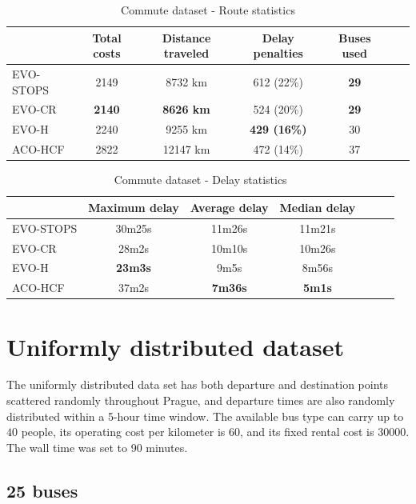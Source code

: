 \begin{table}
    \centering
    \begin{tabular}{lcccccc}
         & Total costs & Distance traveled & Delay penalties & Buses used \\
         \hline
         EVO-STOPS & 2149 & 8732 km & 612 (22\%) & \textbf{29} \\
         EVO-CR & \textbf{2140} & \textbf{8626 km} & 524 (20\%) & \textbf{29} \\
         EVO-H & 2240 & 9255 km & \textbf{429 (16\%)} & 30 \\
         ACO-HCF & 2822 & 12147 km & 472 (14\%) & 37 \\
    \end{tabular}
    \caption{Commute dataset - Route statistics}
    \label{tab:exp_commute_route_stats}
\end{table}

\begin{table}
    \centering
    \begin{tabular}{lcccccc}
         &  Maximum delay & Average delay & Median delay \\
         \hline
         EVO-STOPS & 30m25s & 11m26s & 11m21s \\
         EVO-CR & 28m2s & 10m10s & 10m26s \\
         EVO-H & \textbf{23m3s} & 9m5s & 8m56s \\
         ACO-HCF & 37m2s & \textbf{7m36s} & \textbf{5m1s} \\
    \end{tabular}
    \caption{Commute dataset - Delay statistics}
    \label{tab:exp_commute_delay_stats}
\end{table}

\clearpage

\section{Uniformly distributed dataset}

The uniformly distributed data set has both departure and destination points scattered randomly throughout Prague, and departure times are also randomly distributed within a 5-hour time window. The available bus type can carry up to $40$ people, its operating cost per kilometer is $60$, and its fixed rental cost is $30000$. The wall time was set to 90 minutes.

\subsection{25 buses}

